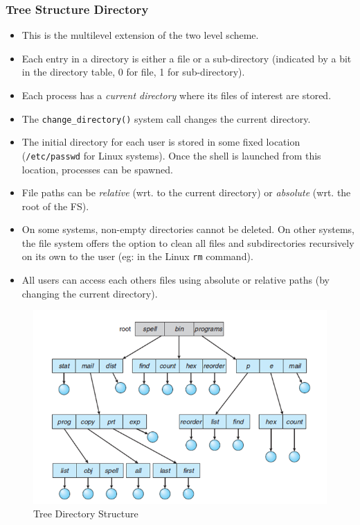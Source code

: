 \documentclass{article}
\theoremstyle{plain}
\theoremstyle{definition}
\begin{document}
\subsubsection{Tree Structure Directory}
\begin{itemize}
    \item This is the multilevel extension of the two level scheme. 
    
    \item Each entry in a directory is either a file or a sub-directory (indicated by a bit in the directory table, 0 for file, 1 for sub-directory).
    
    \item Each process has a \textit{current directory} where its files of interest are stored. 
    
    \item The \texttt{change\_directory()} system call changes the current directory. 
    
    \item The initial directory for each user is stored in some fixed location (\texttt{/etc/passwd} for Linux systems). Once the shell is launched from this location, processes can be spawned. 
    
    \item File paths can be \textit{relative} (wrt. to the current directory) or \textit{absolute} (wrt. the root of the FS). 
    
    \item On some systems, non-empty directories cannot be deleted. On other systems, the file system offers the option to clean all files and subdirectories recursively on its own to the user (eg: in the Linux \texttt{rm} command). 
    
    \item All users can access each others files using absolute or relative paths (by changing the current directory). 
\end{itemize}
\begin{figure}
    \centering
    \includegraphics[scale=0.8]{os4.png}
    \caption{Tree Directory Structure}
    \label{fig:my_label_13}
\end{figure}
\end{document}

